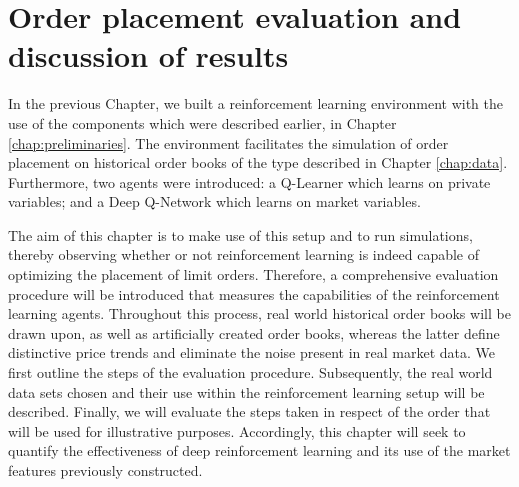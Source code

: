 \chapter{Order placement evaluation and discussion of results}
\label{chap:analysis}

In the previous Chapter, we built a reinforcement learning environment with the use of the components which were described earlier, in Chapter \ref{chap:preliminaries}.
The environment facilitates the simulation of order placement on historical order books of the type described in Chapter \ref{chap:data}.
Furthermore, two agents were introduced: a Q-Learner which learns on private variables; and a Deep Q-Network which learns on market variables.

The aim of this chapter is to make use of this setup and to run simulations, thereby observing whether or not reinforcement learning is indeed capable of optimizing the placement of limit orders.
Therefore, a comprehensive evaluation procedure will be introduced that  measures the capabilities of the reinforcement learning agents.
Throughout this process, real world historical order books will be drawn upon, as well as artificially created order books, whereas the latter define distinctive price trends and eliminate the noise present in real market data.
We first outline the steps of the evaluation procedure.
Subsequently, the real world data sets chosen and their use within the reinforcement learning setup will be described.
Finally, we will evaluate the steps taken in respect of the order that will be used for illustrative purposes.
Accordingly, this chapter will seek to quantify the effectiveness of deep reinforcement learning and its use of the market features previously constructed.

